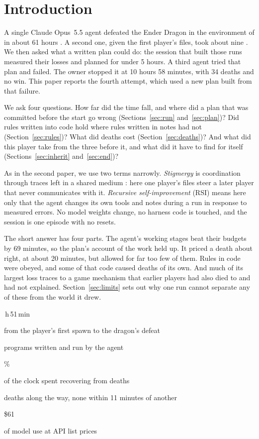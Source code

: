 \documentclass[11pt,a4paper]{article}
\newcommand{\statcell}[2]{%
  \begin{minipage}[t]{0.177\textwidth}\raggedright
    {\sffamily\fontsize{17}{20}\selectfont #1\par}\vspace{3pt}
    {\sffamily\fontsize{7}{8.6}\selectfont\color{inkgrey}#2\par}
  \end{minipage}}
\newcommand{\statsep}{\hspace{0.5em}{\color{rulegrey}\vrule width 0.6pt}\hspace{0.6em}}
\begin{document}
\clearpage
\section{Introduction}

A single Claude Opus~5.5 agent defeated the Ender Dragon in the environment of \citet{faldor2026team} in about 61 hours \citep{batsuk2026single}. A second one, given the first player's files, took about nine \citep{batsuk2026second}. We then asked what a written plan could do: the session that built those runs measured their losses and planned for under 5 hours. A third agent tried that plan and failed. The owner stopped it at 10 hours 58 minutes, with 34 deaths and no win. This paper reports the fourth attempt, which used a new plan built from that failure.

We ask four questions. How far did the time fall, and where did a plan that was committed before the start go wrong (Sections~\ref{sec:run} and~\ref{sec:plan})? Did rules written into code hold where rules written in notes had not (Section~\ref{sec:rules})? What did deaths cost (Section~\ref{sec:deaths})? And what did this player take from the three before it, and what did it have to find for itself (Sections~\ref{sec:inherit} and~\ref{sec:end})?

As in the second paper, we use two terms narrowly. \emph{Stigmergy} is coordination through traces left in a shared medium \citep{grasse1959,theraulaz1999,heylighen2016}: here one player's files steer a later player that never communicates with it. \emph{Recursive self-improvement} (RSI) means here only that the agent changes its own tools and notes during a run in response to measured errors. No model weights change, no harness code is touched, and the session is one episode with no resets.

The short answer has four parts. The agent's working stages beat their budgets by 69 minutes, so the plan's account of the work held up. It priced a death about right, at about 20 minutes, but allowed for far too few of them. Rules in code were obeyed, and some of that code caused deaths of its own. And much of its largest loss traces to a game mechanism that earlier players had also died to and had not explained. Section~\ref{sec:limits} sets out why one run cannot separate any of these from the world it drew.

\vspace{10pt}
\noindent\statcell{6\,h\,51\,min}{from the player's first spawn to the dragon's defeat}%
\statsep\statcell{671}{programs written and run by the agent}%
\statsep\statcell{50\%}{of the clock spent recovering from deaths}%
\statsep\statcell{10}{deaths along the way, none within 11 minutes of another}%
\statsep\statcell{\$61}{of model use at API list prices}
\vspace{6pt}
\end{document}
